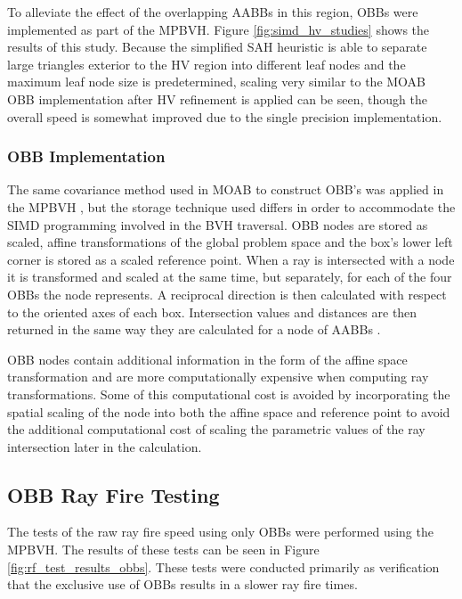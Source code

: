 To alleviate the effect of the overlapping AABBs in this region, OBBs were
implemented as part of the MPBVH. Figure \ref{fig:simd_hv_studies} shows the
results of this study. Because the simplified SAH heuristic is able to separate
large triangles exterior to the HV region into different leaf nodes and the
maximum leaf node size is predetermined, scaling very similar to the MOAB OBB
implementation after HV refinement is applied can be seen, though the overall
speed is somewhat improved due to the single precision implementation.

\subsubsection{OBB Implementation}

The same covariance method used in MOAB to construct OBB's was applied in the
MPBVH \cite{Weghorst_1984}, but the storage technique used differs in order to
accommodate the SIMD programming involved in the BVH traversal. OBB nodes are
stored as scaled, affine transformations of the global problem space and the
box's lower left corner is stored as a scaled reference point. When a ray is
intersected with a node it is transformed and scaled at the same time, but
separately, for each of the four OBBs the node represents. A reciprocal
direction is then calculated with respect to the oriented axes of each
box. Intersection values and distances are then returned in the same way they
are calculated for a node of AABBs \cite{Wald_2014}.

OBB nodes contain additional information in the form of the affine space
transformation and are more computationally expensive when computing ray
transformations. Some of this computational cost is avoided by incorporating the
spatial scaling of the node into both the affine space and reference point to
avoid the additional computational cost of scaling the parametric values of the
ray intersection later in the calculation.

\subsection{OBB Ray Fire Testing}

The tests of the raw ray fire speed using only OBBs were performed using the
MPBVH. The results of these tests can be seen in Figure
\ref{fig:rf_test_results_obbs}. These tests were conducted primarily as
verification that the exclusive use of OBBs results in a slower ray fire times. 

